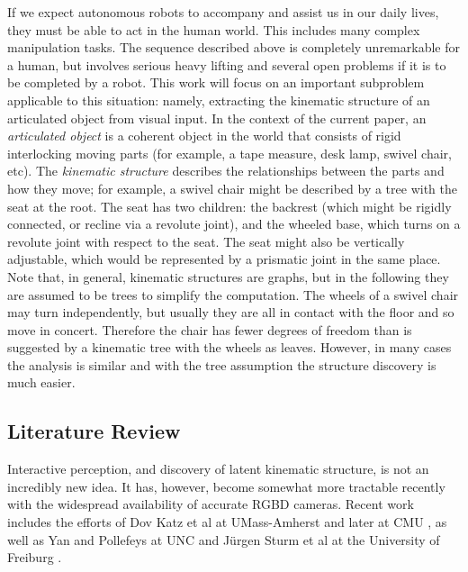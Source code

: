 \documentclass[letterpaper, 10 pt, conference]{ieeeconf}  %
\begin{document}
If we expect autonomous robots to accompany and assist us in our daily lives, they must be able to act in the human world. This includes many complex manipulation tasks. The sequence described above is completely unremarkable for a human, but involves serious heavy lifting and several open problems if it is to be completed by a robot. This work will focus on an important subproblem applicable to this situation: namely, extracting the kinematic structure of an articulated object from visual input. In the context of the current paper, an \emph{articulated object} is a coherent object in the world that consists of rigid interlocking moving parts (for example, a tape measure, desk lamp, swivel chair, etc). The \emph{kinematic structure} describes the relationships between the parts and how they move; for example, a swivel chair might be described by a tree with the seat at the root. The seat has two children: the backrest (which might be rigidly connected, or recline via a revolute joint), and the wheeled base, which turns on a revolute joint with respect to the seat. The seat might also be vertically adjustable, which would be represented by a prismatic joint in the same place. Note that, in general, kinematic structures are graphs, but in the following they are assumed to be trees to simplify the computation. The wheels of a swivel chair may turn independently, but usually they are all in contact with the floor and so move in concert. Therefore the chair has fewer degrees of freedom than is suggested by a kinematic tree with the wheels as leaves. However, in many cases the analysis is similar and with the tree assumption the structure discovery is much easier.

\subsection{Literature Review}
Interactive perception, and discovery of latent kinematic structure, is not an incredibly new idea. It has, however, become somewhat more tractable recently with the widespread availability of accurate RGBD cameras. Recent work includes the efforts of Dov Katz et al at UMass-Amherst \cite{Katz2008,Katz2008a} and later at CMU \cite{Katz2012}, as well as Yan and Pollefeys at UNC \cite{Yan2006} and J\"{u}rgen Sturm et al at the University of Freiburg \cite{Sturm2011}.
\end{document}
